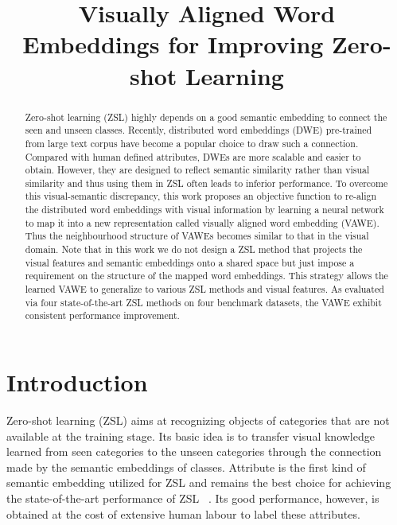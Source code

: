 \documentclass{bmvc2k}
\title{Visually Aligned Word Embeddings for Improving Zero-shot Learning}
\begin{document}
\maketitle

\begin{abstract}
Zero-shot learning (ZSL) highly depends on a good semantic embedding to connect the seen and unseen classes. Recently, distributed word embeddings (DWE) pre-trained from large text corpus have become a popular choice to draw such a connection. Compared with human defined attributes, DWEs are more scalable and easier to obtain. However, they are designed to reflect semantic similarity rather than visual similarity and thus using them in ZSL often leads to inferior performance. To overcome this visual-semantic discrepancy, this work proposes an objective function to re-align the distributed word embeddings with visual information by learning a neural network to map it into a new representation called visually aligned word embedding (VAWE). Thus the neighbourhood structure of VAWEs becomes similar to that in the visual domain.  Note that in this work we do not design a ZSL method that projects the visual features and semantic embeddings onto a shared space but just impose a requirement on the structure of the mapped word embeddings. This strategy allows the learned VAWE to generalize to various ZSL methods and visual features. As evaluated via four state-of-the-art ZSL methods on four benchmark datasets, the VAWE exhibit consistent performance improvement.
\end{abstract}



\section{Introduction}
\label{sec:intro}
Zero-shot learning (ZSL) aims at recognizing objects of categories that are not available at the training stage. Its basic idea is to transfer visual knowledge learned from seen categories to the unseen categories through the connection made by the semantic embeddings of classes. Attribute \cite{Farhadi09describingobjects} is the first kind of semantic embedding utilized for ZSL and remains the best choice for achieving the state-of-the-art performance of ZSL ~\cite{Akata15output,Zhang2015ICCV}. Its good performance, however, is obtained at the cost of extensive human labour to label these attributes.
\end{document}

